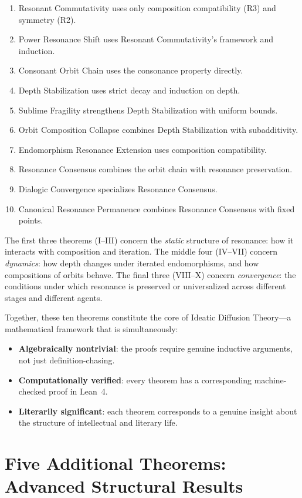 \documentclass[11pt,openany]{book}
\theoremstyle{definition}
\theoremstyle{plain}
\theoremstyle{remark}
\begin{document}
\begin{enumerate}
\item Resonant Commutativity uses only composition compatibility (R3) and symmetry (R2).
\item Power Resonance Shift uses Resonant Commutativity's framework and induction.
\item Consonant Orbit Chain uses the consonance property directly.
\item Depth Stabilization uses strict decay and induction on depth.
\item Sublime Fragility strengthens Depth Stabilization with uniform bounds.
\item Orbit Composition Collapse combines Depth Stabilization with subadditivity.
\item Endomorphism Resonance Extension uses composition compatibility.
\item Resonance Consensus combines the orbit chain with resonance preservation.
\item Dialogic Convergence specializes Resonance Consensus.
\item Canonical Resonance Permanence combines Resonance Consensus with fixed points.
\end{enumerate}

The first three theorems (I--III) concern the \emph{static} structure of resonance: how it interacts with composition and iteration. The middle four (IV--VII) concern \emph{dynamics}: how depth changes under iterated endomorphisms, and how compositions of orbits behave. The final three (VIII--X) concern \emph{convergence}: the conditions under which resonance is preserved or universalized across different stages and different agents.

Together, these ten theorems constitute the core of Ideatic Diffusion Theory---a mathematical framework that is simultaneously:
\begin{itemize}
\item \textbf{Algebraically nontrivial}: the proofs require genuine inductive arguments, not just definition-chasing.
\item \textbf{Computationally verified}: every theorem has a corresponding machine-checked proof in Lean~4.
\item \textbf{Literarily significant}: each theorem corresponds to a genuine insight about the structure of intellectual and literary life.
\end{itemize}

\section{Five Additional Theorems: Advanced Structural Results}
\end{document}
